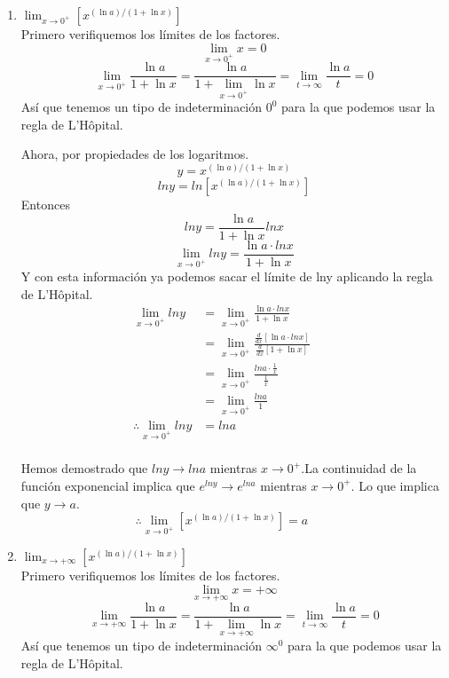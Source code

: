 \documentclass[12pt]{article}
\begin{document}
\begin{enumerate}[label=(\alph*)]
\item $\lim_{x \to 0^+} [x^{(\ln a)/(1+\ln x)}] \qquad$\\
Primero verifiquemos los límites de los factores.
\[
\lim_{x \to 0^+} x= 0
\]
\[
 \lim_{x \to 0^+} \frac{\ln a}{1+\ln x} =  \frac{\ln a}{1+  \lim_{x \to 0^+} \ln x}  =  \lim_{t \to \infty}  \frac{\ln a}{t} = 0
 \]
 Así que tenemos un tipo de indeterminación $0^{0}$ para la que podemos usar la regla de L'Hôpital.

 Ahora, por propiedades de los logaritmos.
 \[
 y =  x^{(\ln a)/(1+\ln x)}
 \]
  \[
 lny =  ln \left[x^{(\ln a)/(1+\ln x)}\right]
 \]
 Entonces
\[
   lny =  \frac{\ln a}{1+\ln x}   lnx
   \]
   \[
     \lim_{x \to 0^+} lny =  \frac{\ln a \cdot lnx}{1+\ln x}   
   \]
Y con esta información ya podemos sacar el límite de lny aplicando la regla de  L'Hôpital.
\begin{equation*}
  \begin{split}
    \lim_{x \to 0^+}lny
    &=  \lim_{x \to 0^+}  \frac{\ln a \cdot lnx}{1+\ln x}   \qquad\\
    &=  \lim_{x \to 0^+}  \frac{ \frac{d}{dx} [\ln a \cdot lnx]}{ \frac{d}{dx} [ 1+\ln x ]}   \qquad\\
    &=  \lim_{x \to 0^+}  \frac{ lna \cdot \frac{1}{x}}{  \frac{1}{x}}   \qquad\\
    &=  \lim_{x \to 0^+}  \frac{ lna}{1}   \qquad\\
  \therefore
   \lim_{x \to 0^+}lny
     &= lna \\
  \end{split}
\end{equation*}

Hemos demostrado que $lny   \rightarrow lna $ mientras $x \rightarrow 0^{+}$.La continuidad de la función exponencial implica que $e^{lny}  \rightarrow e^{lna} $ mientras   $x \rightarrow 0^{+}$. Lo que implica que $y \rightarrow a $.
\[
\therefore
\lim_{x \to 0^+} [x^{(\ln a)/(1+\ln x)}]=a \qquad 
\]

\item $\lim_{x \to +\infty} [x^{(\ln a)/(1+\ln x)}] \qquad$\\

Primero verifiquemos los límites de los factores.
\[
\lim_{x \to +\infty}  x= + \infty
\]
\[
\lim_{x \to +\infty}  \frac{\ln a}{1+\ln x} =  \frac{\ln a}{1+  \lim_{x \to +\infty} \ln x}  =  \lim_{t \to \infty}  \frac{\ln a}{t} = 0
 \]
 Así que tenemos un tipo de indeterminación $\infty ^{0}$ para la que podemos usar la regla de L'Hôpital.


\end{enumerate}
\end{document}
